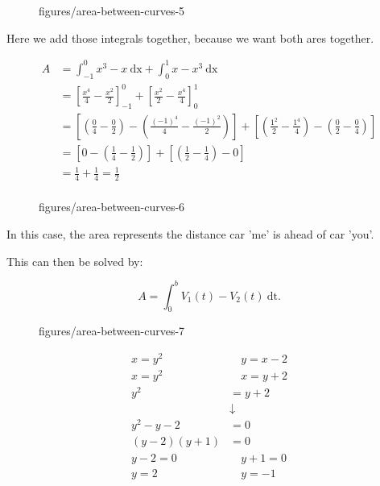 
\begin{figure}[htbp]
    \centering
    \caption{figures/area-between-curves-5}
    \label{fig:area-between-curves-5}
\end{figure}

Here we add those integrals together, because we want both ares together.

\begin{align*}
    A&= \int_{-1}^{0} x^3-x \ \text{dx} + \int_{0}^{1} x-x^3 \ \text{dx}   \\
    &= \left[  \frac{x^4}{4}-\frac{x^2}{2} \right]^0_{-1} + \left[ \frac{x^2}{2}-\frac{x^4}{4} \right]^1_0  \\
    &= \left[ \left( \frac{0}{4}- \frac{0}{2} \right) - \left( \frac{(-1)^4}{4}- \frac{(-1)^2}{2} \right)  \right]+ 
    \left[ \left( \frac{1^2}{2}- \frac{1^4}{4} \right)- \left( \frac{0}{2}- \frac{0}{4} \right)   \right]  \\
    &= \left[ 0-\left( \frac{1}{4} - \frac{1}{2} \right)  \right] + \left[ \left( \frac{1}{2}-\frac{1}{4} \right) -0 \right]  \\
    &= \frac{1}{4}+\frac{1}{4}= \frac{1}{2} \\
\end{align*}


\begin{figure}[ht]
    \centering
    \caption{figures/area-between-curves-6}
    \label{fig:area-between-curves-6}
\end{figure}

In this case, the area represents the distance car 'me' is ahead of car 'you'.

This can then be solved by:

\[
A=\int_{0}^{b} V_1(t) - V_2(t) \ \text{dt}
.\] 


\begin{figure}[ht]
    \centering
    \caption{figures/area-between-curves-7}
    \label{fig:area-between-curves-7}
\end{figure}

\begin{align*}
    x=y^2 \quad & \quad y=x-2\\
    x=y^2 \quad & \quad x=y+2\\
    y^2&= y+2 \\
       &\downarrow \\
    y^2-y-2&= 0 \\
    (y-2)(y+1)&= 0 \\
    y-2=0 \quad & \quad y+1=0 \\
    y=2 \quad & \quad y=-1 \\
\end{align*}

